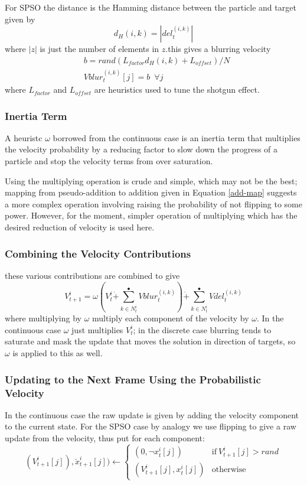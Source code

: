 \documentclass[a4paper,oneside,english]{book}
\numberwithin{equation}{section}
\numberwithin{figure}{section}
\begin{document}
For SPSO the distance is the Hamming distance between the particle and target given by
\begin{equation}\label{H-dist}
d_H(i,k)=|del_t^{(i,k)}|
\end{equation}
where $|z|$ is just the number of elements in $z$.this gives a blurring velocity
\begin{align}\label{blur-vel}
&b=rand(L_{factor}d_H(i,k)+L_{offset})/N\\
&Vblur_t^{(i,k)}[j]=b\:\; \forall j
\end{align}
where $L_{factor}$ and $L_{offset}$ are heuristics used to tune the shotgun effect.
\subsubsection{Inertia Term}
A heuristc $\omega$ borrowed from the continuous case is an inertia  term that multiplies the velocity probability by a reducing factor to slow down the progress of a particle and stop the velocity terms from over saturation.

Using the multiplying operation is crude and simple, which may not be the best; mapping from pseudo-addition to addition given in Equation \ref{add-map} suggests a more complex operation involving raising the probability of not flipping to some power. However, for the moment, simpler operation of multiplying which has the desired reduction of velocity is used here.
     
\subsubsection{Combining the Velocity Contributions}

these various contributions are combined to give
\begin{equation}\label{tot-velocity}
V_{t+1}^i=\omega\left (V_t^i\dot{+}\sum_{k \in N_t^i}^\bullet Vblur_t^{(i,k)}\right )\dot{+}\sum_{k \in N_t^i}^\bullet Vdel_t^{(i,k)}
\end{equation}
where multiplying by $\omega$ multiply each component of the velocity by $\omega$. In the continuous case  $\omega$ just multiplies $V_t^i$;
in the discrete case blurring tends to saturate and mask the update that moves the solution in direction of targets, so $\omega$ is applied to this as well.
         
\subsubsection{Updating to the Next Frame Using the Probabilistic Velocity}
In the continuous case the raw update is given by adding the velocity component to the current state. For the SPSO case by analogy we use flipping to give a raw update from the velocity,
thus put for each component:
\begin{equation}\label{raw_update}
(V_{t+1}^i[j]),\breve{x}_{t+1}^i[j]) \leftarrow\left\lbrace 
\begin{array}{cc}
(0,\neg x_t^i[j])&\mathrm{if}\:V_{t+1}^i[j]>rand \\
(V_{t+1}^i[j],x_t^i[j])&\mathrm{otherwise}
\end{array}\right.
\end{equation}
 
\end{document}
